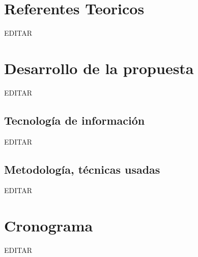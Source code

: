 \documentclass[preprint,12pt]{elsarticle}
\begin{document}
 


\section{Referentes Teoricos}

EDITAR\\




\section{Desarrollo de la propuesta}

EDITAR\\


\subsection{\textbf{Tecnología de información}}

EDITAR\\


\subsection{\textbf{Metodología, técnicas usadas}}

EDITAR\\



\section{Cronograma}

EDITAR\\




	
	\newpage
	
		 
	
	
\end{document}
